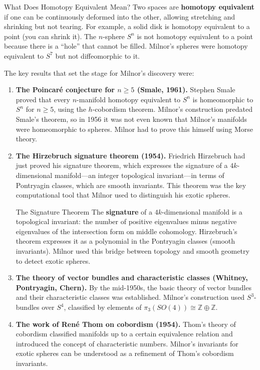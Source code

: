 \begin{knowledgebridge}{What Does Homotopy Equivalent Mean?}
Two spaces are \textbf{homotopy equivalent} if one can be continuously deformed into the other, allowing stretching and shrinking but not tearing. For example, a solid disk is homotopy equivalent to a point (you can shrink it). The $n$-sphere $S^n$ is not homotopy equivalent to a point because there is a ``hole'' that cannot be filled. Milnor's spheres were homotopy equivalent to $S^7$ but not diffeomorphic to it.
\end{knowledgebridge}

The key results that set the stage for Milnor's discovery were:

\begin{enumerate}
\item \textbf{The Poincaré conjecture for $n \geq 5$ (Smale, 1961).} Stephen Smale proved that every $n$-manifold homotopy equivalent to $S^n$ is homeomorphic to $S^n$ for $n \geq 5$, using the $h$-cobordism theorem. Milnor's construction predated Smale's theorem, so in 1956 it was not even known that Milnor's manifolds were homeomorphic to spheres. Milnor had to prove this himself using Morse theory.
\item \textbf{The Hirzebruch signature theorem (1954).} Friedrich Hirzebruch had just proved his signature theorem, which expresses the signature of a $4k$-dimensional manifold---an integer topological invariant---in terms of Pontryagin classes, which are smooth invariants. This theorem was the key computational tool that Milnor used to distinguish his exotic spheres.

\begin{primer}{The Signature Theorem}
The \textbf{signature} of a $4k$-dimensional manifold is a topological invariant: the number of positive eigenvalues minus negative eigenvalues of the intersection form on middle cohomology. Hirzebruch's theorem expresses it as a polynomial in the Pontryagin classes (smooth invariants). Milnor used this bridge between topology and smooth geometry to detect exotic spheres.
\end{primer}
\item \textbf{The theory of vector bundles and characteristic classes (Whitney, Pontryagin, Chern).} By the mid-1950s, the basic theory of vector bundles and their characteristic classes was established. Milnor's construction used $S^3$-bundles over $S^4$, classified by elements of $\pi_3(SO(4)) \cong \mathbb{Z} \oplus \mathbb{Z}$.
\item \textbf{The work of René Thom on cobordism (1954).} Thom's theory of cobordism classified manifolds up to a certain equivalence relation and introduced the concept of characteristic numbers. Milnor's invariants for exotic spheres can be understood as a refinement of Thom's cobordism invariants.
\end{enumerate}

